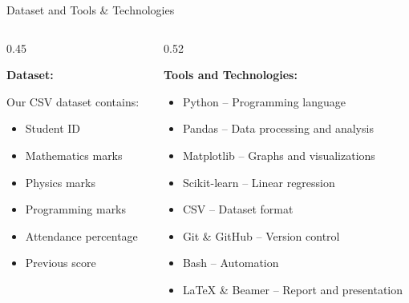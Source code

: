 \documentclass{beamer}
\begin{document}
\begin{frame}{Dataset and Tools \& Technologies}

\begin{columns}[T]

\begin{column}{0.45\textwidth}
\raggedright
\textbf{Dataset:}

Our CSV dataset contains:

\begin{itemize}
\item Student ID
\item Mathematics marks
\item Physics marks
\item Programming marks
\item Attendance percentage
\item Previous score
\end{itemize}

\end{column}


\begin{column}{0.52\textwidth}
\raggedright
\textbf{Tools and Technologies:}

\begin{itemize}
\item Python – Programming language
\item Pandas – Data processing and analysis
\item Matplotlib – Graphs and visualizations
\item Scikit-learn – Linear regression
\item CSV – Dataset format
\item Git \& GitHub – Version control
\item Bash – Automation
\item LaTeX \& Beamer – Report and presentation
\end{itemize}

\end{column}

\end{columns}

\end{frame}

\end{document}
